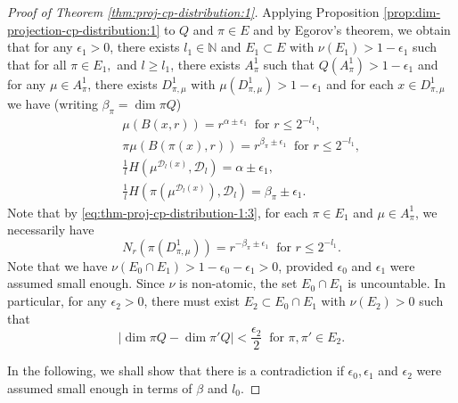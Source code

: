 \documentclass[a4paper,11pt]{amsart}
\theoremstyle{definition}
\numberwithin{equation}{section}
\def\D{\mathcal{D}}
\def\N{\mathbb N}
\begin{document}
\begin{proof}[Proof of Theorem \ref{thm:proj-cp-distribution:1}]
Applying Proposition \ref{prop:dim-projection-cp-distribution:1} to $Q$ and $\pi\in E$ and by Egorov's theorem,  we obtain that for any $\epsilon_1>0$,  there exists $l_1\in \N$ and $E_1\subset E$ with $\nu(E_1)>1-\epsilon_1$ such that for all  $\pi\in E_1,$ and  $l\ge l_1$, there exists $A_\pi^1$ such that $Q(A_\pi^1)>1-\epsilon_1$ and for any $\mu\in A_\pi^1$, there exists $D_{\pi,\mu}^1$ with $\mu(D_{\pi,\mu}^1)>1-\epsilon_1$ and for each $x\in D_{\pi,\mu}^1$ we have (writing $\beta_\pi=\dim \pi Q$)
\begin{eqnarray}
 & & \mu(B(x,r))= r^{\alpha\pm \epsilon_1} \  \textrm{ for }  r\le 2^{-l_1},  \label{eq:thm-proj-cp-distribution-1:2}\\
& & \pi\mu(B(\pi(x),r)) = r^{\beta_\pi\pm \epsilon_1} \  \textrm{ for } r\le 2^{-l_1}, \label{eq:thm-proj-cp-distribution-1:3}\\
& & \frac{1}{l}H\left(\mu^{\D_l(x)},\D_l\right) = \alpha\pm \epsilon_1,\label{eq:thm-proj-cp-distribution-1:4}\\
& & \frac{1}{l}H\left(\pi\left(\mu^{\D_l(x)}\right),\D_l\right) = \beta_\pi\pm \epsilon_1. \label{eq:thm-proj-cp-distribution-1:5}
\end{eqnarray}
Note that by \eqref{eq:thm-proj-cp-distribution-1:3},  for each $\pi\in E_1$ and $\mu\in A_{\pi}^1$, we necessarily have
\begin{equation}\label{eq:thm-proj-cp-distribution-1:6}
N_{r}(\pi(D_{\pi,\mu}^1)) = r^{-\beta_\pi\pm \epsilon_1} \ \textrm{ for } r\le 2^{-l_1}.
\end{equation}
Note that we have $\nu(E_0\cap E_1)>1-\epsilon_0-\epsilon_1>0$, provided $\epsilon_0$ and $\epsilon_1$ were assumed small enough.  Since $\nu$ is non-atomic, the set $E_0\cap E_1$ is uncountable. In particular,  for any $\epsilon_2>0$,   there must exist $E_2\subset E_0\cap E_1$ with $\nu(E_2)>0$ such that 
 \begin{equation}\label{eq:thm-proj-cp-distribution-1:7}
|\dim \pi Q-\dim \pi' Q | <\frac{\epsilon_2}{2} \ \textrm{ for }\pi,\pi'\in E_2.
\end{equation}

In the following, we shall show that there is a contradiction if $\epsilon_0,\epsilon_1$ and $\epsilon_2$ were assumed  small enough in terms of $\beta$ and $l_0$. 


\end{proof}
\end{document}
